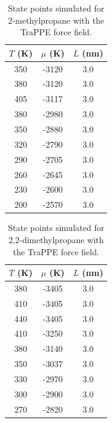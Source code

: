 \documentclass[journal=jctc,manuscript=article]{achemso}
\begin{document}
\begin{table}[htb!]
	\caption{State points simulated for 2-methylpropane with the TraPPE force field.}
	\begin{center}
		\begin{tabular}{|c|c|c|}
			\hline
			$T$ (K) & $\mu$ (K) & $L$ (nm) \\ \hline
			350	&	-3120	&	3.0	\\
			380	&	-3120	&	3.0	\\
			405	&	-3117	&	3.0	\\
			380	&	-2980	&	3.0	\\
			350	&	-2880	&	3.0	\\
			320	&	-2790	&	3.0	\\
			290	&	-2705	&	3.0	\\
			260	&	-2645	&	3.0	\\
			230	&	-2600	&	3.0	\\
			200	&	-2570	&	3.0	\\
			\hline
		\end{tabular}
	\end{center}
\end{table}

\begin{table}[htb!]
	\caption{State points simulated for 2,2-dimethylpropane with the TraPPE force field.}
	\begin{center}
		\begin{tabular}{|c|c|c|}
			\hline
			$T$ (K) & $\mu$ (K) & $L$ (nm) \\ \hline
			380	&	-3405	&	3.0	\\
			410	&	-3405	&	3.0	\\
			440	&	-3405	&	3.0	\\
			410	&	-3250	&	3.0	\\
			380	&	-3140	&	3.0	\\
			350	&	-3037	&	3.0	\\
			330	&	-2970	&	3.0	\\
			300	&	-2900	&	3.0	\\
			270	&	-2820	&	3.0	\\
			\hline
		\end{tabular}
	\end{center}
\end{table}
\end{document}
